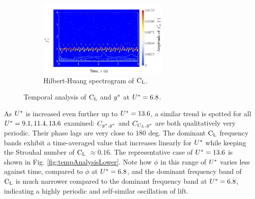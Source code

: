 \documentclass[oneside]{utmthesis}
\begin{document}
\begin{figure}[H]
  \begin{subfigure}[h]{1\textwidth}
    \hspace{2.4cm}
    \includegraphics[width=0.7\textwidth]{figs/tempAnalysisUpper-c}
    \caption{Hilbert-Huang spectrogram of $\text{C}_{\text{L}}$.}
    \label{fig:tempAnalysisUpper-c}
  \end{subfigure}
  \caption{Temporal analysis of $\text{C}_{\text{L}}$ and $y^{*}$ at $U^{*} = 6.8$.} \label{fig:tempAnalysisUpper}
\end{figure}

As $U^{*}$ is increased even further up to $U^{*} = 13.6$, a similar trend is spotted for all $U^{*} = 9.1, 11.4, 13.6$ examined: $C_{y^{*},y^{*}}$ and $C_{\text{C}_{L},y^{*}}$ are both qualitatively very periodic. Their phase lags are very close to $180$ deg. The dominant $\text{C}_{\text{L}}$ frequency bands exhibit a time-averaged value that increases linearly for $U^{*}$ while keeping the Strouhal number of $\text{C}_{\text{L}}$ $\approx 0.16$. The representative case of $U^{*} = 13.6$ is shown in Fig. \ref{fig:tempAnalysisLower}. Note how $\phi$ in this range of $U^{*}$ varies less against time, compared to $\phi$ at $U^{*} = 6.8$, and the dominant frequency band of $\text{C}_{\text{L}}$ is much narrower compared to the dominant frequency band at $U^{*} = 6.8$, indicating a highly periodic and self-similar oscillation of lift.
\end{document}
